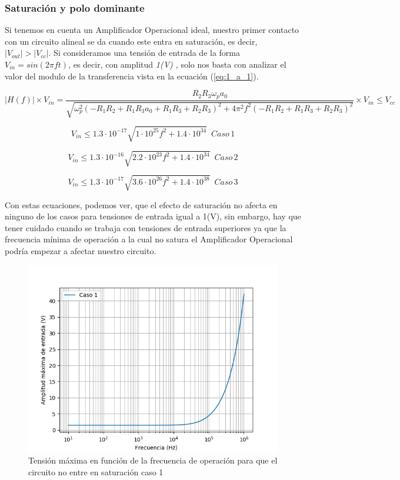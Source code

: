 \subsubsection{Saturación y polo dominante}

Si tenemos en cuenta un Amplificador Operacional ideal, nuestro primer
contacto con un circuito alineal se da cuando este entra en saturación,
es decir, $\left|V_{out}\right|>\left|V_{cc}\right|$. Si consideramos
una tensión de entrada de la forma $V_{in}=sin(2\pi ft)$, es decir,
con amplitud \emph{1(V)} \emph{, }solo nos basta con analizar el valor
del modulo de la transferencia vista en la ecuación (\ref{eq:1_a_1}).

\[
\left|H(f)\right|\times V_{in}=\frac{R_{2}R_{3}\omega_{p}a_{0}}{\sqrt{\omega_{p}^{2}\left(-R_{1}R_{2}+R_{1}R_{3}a_{0}+R_{1}R_{3}+R_{2}R_{3}\right)^{2}+4\pi^{2}f^{2}\left(-R_{1}R_{2}+R_{1}R_{3}+R_{2}R_{3}\right)^{2}}}\times V_{in}\leq V_{cc}
\]

\[
V_{in}\leq1.3\cdot10^{-17}\sqrt{1\cdot10^{25}f^{2}+1.4\cdot10^{34}}\,\,\,Caso\,1
\]

\[
V_{in}\leq1.3\cdot10^{-16}\sqrt{2.2\cdot10^{23}f^{2}+1.4\cdot10^{34}}\,\,\,Caso\,2
\]

\[
V_{in}\leq1.3\cdot10^{-17}\sqrt{3.6\cdot10^{26}f^{2}+1.4\cdot10^{38}}\,\,\,Caso\,3
\]

Con estas ecuaciones, podemos ver, que el efecto de saturación no
afecta en ninguno de los casos para tensiones de entrada igual a 1(V),
sin embargo, hay que tener cuidado cuando se trabaja con tensiones
de entrada superiores ya que la frecuencia mínima de operación a la
cual no satura el Amplificador Operacional podría empezar a afectar
nuestro circuito.

\begin{figure}[H]
\begin{centering}
\includegraphics[scale=0.5]{../Ex1/iA/Resources1a/sat1}
\par\end{centering}
\caption{Tensión máxima en función de la frecuencia de operación para que el
circuito no entre en saturación caso 1}
\end{figure}

